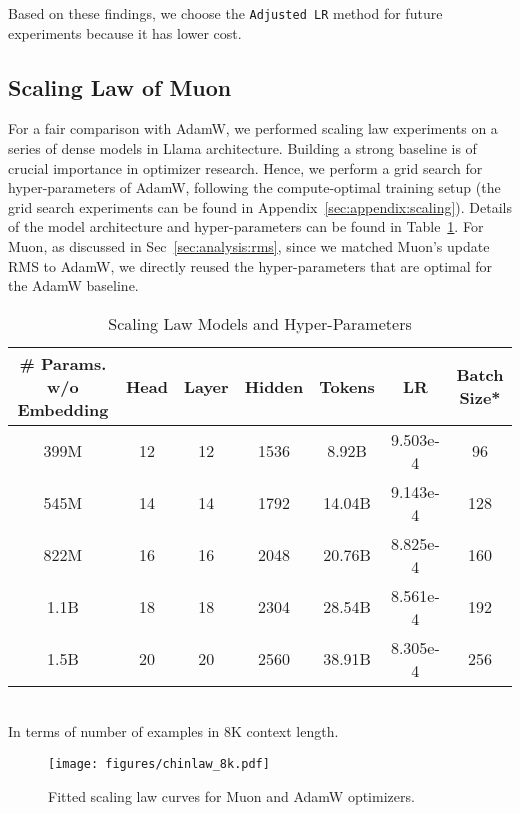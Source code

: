 Based on these findings, we choose the \texttt{Adjusted LR} method for future experiments because it has lower cost.

\subsection{Scaling Law of Muon}
\label{sec:exp:moonscalinglaw}

For a fair comparison with AdamW, we performed scaling law experiments on a series of dense models in Llama \citep{grattafiori2024llama3herdmodels} architecture. Building a strong baseline is of crucial importance in optimizer research. Hence, we perform a grid search for hyper-parameters of AdamW, following the compute-optimal training setup \citep{kaplan2020scalinglawsneurallanguage} (the grid search experiments can be found in Appendix~\ref{sec:appendix:scaling}). Details of the model architecture and hyper-parameters can be found in Table~\ref{tab:model-specs}. For Muon, as discussed in Sec~\ref{sec:analysis:rms}, since we matched Muon's update RMS to AdamW, we directly reused the hyper-parameters that are optimal for the AdamW baseline.

\begin{table}[t]
\small
\centering
\caption{Scaling Law Models and Hyper-Parameters}
\label{tab:model-specs}
\begin{tabular}{c|c|c|c|c|c|c}
\toprule
\# Params. w/o Embedding & Head & Layer & Hidden & Tokens & LR & Batch Size* \\
\midrule
399M & 12 & 12 & 1536 & 8.92B  & 9.503e-4 & 96  \\
545M & 14 & 14 & 1792 & 14.04B & 9.143e-4 & 128 \\
822M & 16 & 16 & 2048 & 20.76B & 8.825e-4 & 160 \\
1.1B & 18 & 18 & 2304 & 28.54B & 8.561e-4 & 192 \\
1.5B & 20 & 20 & 2560 & 38.91B & 8.305e-4 & 256 \\
\bottomrule
\end{tabular}
\\ \footnotesize{\small *In terms of number of examples in 8K context length.} 
\end{table}


\begin{figure}[h]
    \centering
    \texttt{[image: figures/chinlaw\_8k.pdf]}
    \caption{Fitted scaling law curves for Muon and AdamW optimizers.}
    \label{fig:scaling_lm_loss_fitting}
\end{figure}


